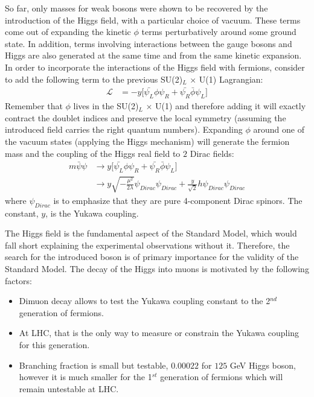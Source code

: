 So far, only masses for weak bosons were shown to be recovered by the introduction of the Higgs field, with a particular choice of vacuum. These terms come out of expanding the kinetic $\phi$ terms perturbatively around some ground state. In addition, terms involving interactions between the gauge bosons and Higgs are also generated at the same time and from the same kinetic expansion. In order to incorporate the interactions of the Higgs field with fermions, consider to add the following term to the previous SU(2)$_L$ $\times$ U(1) Lagrangian:
\begin{subequations}\label{eq:higgs_introduction_fermionmasses}
\begin{align}
    \mathcal{L}& = - y \lbrack \bar{\psi_L}\phi\psi_R + \bar{\psi_R}\bar{\phi}\psi_L \rbrack
\end{align}
\end{subequations}
Remember that $\phi$ lives in the SU(2)$_L$ $\times$ U(1) and therefore adding it will exactly contract the doublet indices and preserve the local symmetry (assuming the introduced field carries the right quantum numbers). Expanding $\phi$ around one of the vacuum states (applying the Higgs mechanism) will generate the fermion mass and the coupling of the Higgs real field to $2$ Dirac fields:
\begin{subequations}\label{eq:higgs_introduction_fermionmassterms}
\begin{align}
    m\bar{\psi}\psi& \rightarrow y \lbrack \bar{\psi_L}\phi\psi_R + \bar{\psi_R}\bar{\phi}\psi_L \rbrack\\
    & \rightarrow y\sqrt{-\frac{\mu^2}{2\lambda}}\psi_{Dirac}\psi_{Dirac} + \frac{y}{\sqrt{2}}h\psi_{Dirac}\psi_{Dirac}
\end{align}
\end{subequations}
where $\psi_{Dirac}$ is to emphasize that they are pure 4-component Dirac spinors. The constant, $y$, is the Yukawa coupling.

The Higgs field is the fundamental aspect of the Standard Model, which would fall short explaining the experimental observations without it. Therefore, the search for the introduced boson is of primary importance for the validity of the Standard Model. The decay of the Higgs into muons is motivated by the following factors:
\begin{itemize}
    \item Dimuon decay allows to test the Yukawa coupling constant to the 2$^{nd}$ generation of fermions.
    \item At LHC, that is the only way to measure or constrain the Yukawa coupling for this generation.
    \item Branching fraction is small but testable, $0.00022$ for $125$ GeV Higgs boson, however it is much smaller for the 1$^{st}$ generation of fermions which will remain untestable at LHC.
\end{itemize}